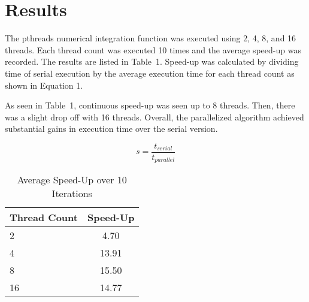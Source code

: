 \documentclass[12pt]{article}
\begin{document}
\pagebreak
\vspace{-0.6cm}
\section{Results}
\vspace{-0.4cm}
\qquad The pthreads numerical integration function was executed using 2, 4, 8, and 16 threads. Each thread count was executed 10 times and
the average speed-up was recorded. The results are listed in 
Table~1. Speed-up was calculated by dividing time of 
serial execution by the average execution time for each thread count
as shown in Equation 1.

As seen in Table~1, continuous speed-up was seen 
up to 8 threads. Then, there was a slight drop off with 16 threads.
Overall, the parallelized algorithm achieved substantial gains
in execution time over the serial version. 

\begin{equation}
    s = \frac{t_{serial}}{t_{parallel}}\label{eq1}
\end{equation}

\begin{table}[H]
\centering
\begin{tabular}{@{}|l|c|}
\hline
Thread Count & Speed-Up \\ \hline
2  & 4.70  \\ \hline 
4  & 13.91 \\ \hline 
8  & 15.50 \\ \hline 
16 & 14.77 \\ \hline 
\end{tabular}
\caption{Average Speed-Up over 10 Iterations}
\end{table}
\end{document}
